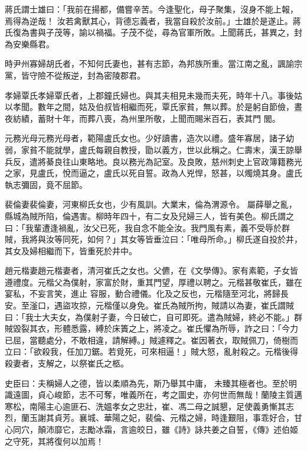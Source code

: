 \begin{pinyinscope}
 蔣氏謂士雄曰：「我前在揚都，備嘗辛苦。今逢聖化，母子聚集，沒身不能上報，焉得為逆哉！
 汝若禽獸其心，背德忘義者，我當自殺於汝前。」士雄於是遂止。蔣氏復為書與子茂等，諭以禍福。子茂不從，尋為官軍所敗。上聞蔣氏，甚異之，封為安樂縣君。



 時尹州寡婦胡氏者，不知何氏妻也，甚有志節，為邦族所重。當江南之亂，諷諭宗黨，皆守險不從叛逆，封為密陵郡君。



 孝婦覃氏孝婦覃氏者，上郡鐘氏婦也。與其夫相見未幾而夫死，時年十八。事後姑以孝聞。數年之間，姑及伯叔皆相繼而死，覃氏家貧，無以葬。於是躬自節儉，晝夜紡績，蓄財十年，而葬八喪，為州里所敬，上聞而賜米百石，表其門
 閭。



 元務光母元務光母者，範陽盧氏女也。少好讀書，造次以禮。盛年寡居，諸子幼弱，家貧不能就學，盧氏每親自教授，勖以義方，世以此稱之。仁壽末，漢王諒舉兵反，遣將綦良往山東略地。良以務光為記室。及良敗，慈州刺史上官政簿籍務光之家，見盧氏，悅而逼之，盧氏以死自誓。政為人兇悍，怒甚，以燭燒其身。盧氏執志彌固，竟不屈節。



 裴倫妻裴倫妻，河東柳氏女也，少有風訓。大業末，倫為渭源令。
 屬薛舉之亂，縣城為賊所陷，倫遇害。柳時年四十，有二女及兒婦三人，皆有美色。柳氏謂之曰：「我輩遭逢禍亂，汝父已死，我自念不能全汝。我門風有素，義不受辱於群賊，我將與汝等同死，如何？」其女等皆垂泣曰：「唯母所命。」柳氏遂自投於井，其女及婦相繼而下，皆重死於井中。



 趙元楷妻趙元楷妻者，清河崔氏之女也。父儦，在《文學傳》。家有素範，子女皆遵禮度。元楷父為僕射，家富於財，重其門望，厚禮以聘之。元楷甚敬崔氏，雖在宴私，不妄言笑，進止
 容服，動合禮儀。化及之反也，元楷隨至河北，將歸長安。至滏口，遇盜攻掠，元楷僅以身免。崔氏為賊所拘，賊請以為妻，崔氏謂賊曰：「我士大夫女，為僕射子妻，今日破亡，自可即死。遣為賊婦，終必不能。」群賊毀裂其衣，形體悉露，縛於床簀之上，將凌之。崔氏懼為所辱，詐之曰：「今力已屈，當聽處分，不敢相違，請解縛。」賊遽釋之。崔因著衣，取賊佩刀，倚樹而立曰：「欲殺我，任加刀鋸。若覓死，可來相逼！」賊大怒，亂射殺之。元楷後得殺妻者，支解之，以祭崔氏之柩。



 史臣曰：夫稱婦人之德，皆以柔順為先，斯乃舉其中庸，
 未臻其極者也。至於明識遠圖，貞心峻節，志不可奪，唯義所在，考之圖史，亦何世而無哉！蘭陵主質邁寒松，南陽主心逾匪石、洗媼孝女之忠壯，崔、馮二母之誠懇，足使義勇慚其志烈，蘭玉謝其貞芳。襄城、華陽之妃，裴倫、元楷之婦，時逢艱阻，事乖好合，甘心同穴，顛沛靡它，志勵冰霜，言逾皎日，雖《詩》詠共姜之自誓，《傳》述伯姬之守死，其將復何以加焉！



\end{pinyinscope}